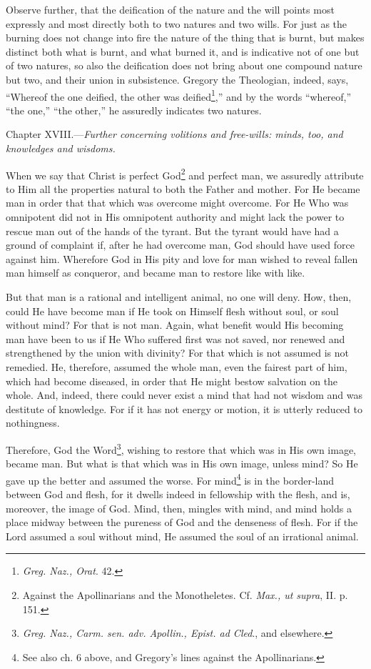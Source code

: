 Observe further, that the deification of the nature and the will points most expressly and most directly both to two natures and two wills. For just as the burning does not change into fire the nature of the thing that is burnt, but makes distinct both what is burnt, and what burned it, and is indicative not of one but of two natures, so also the deification does not bring about one compound nature but two, and their union in subsistence. Gregory the Theologian, indeed, says, “Whereof the one deified, the other was deified\footnote{\emph{Greg. Naz., Orat}. 42.},” and by the words “whereof,” “the one,” “the other,” he assuredly indicates two natures.


Chapter XVIII.—\emph{Further concerning volitions and free-wills: minds, too, and knowledges and wisdoms.}

When we say that Christ is perfect God\footnote{Against the Apollinarians and the Monotheletes. Cf. \emph{Max., ut supra}, II. p. 151.} and perfect man, we assuredly attribute to Him all the properties natural to both the Father and mother. For He became man in order that that which was overcome might overcome. For He Who was omnipotent did not in His omnipotent authority and might lack the power to rescue man out of the hands of the tyrant. But the tyrant would have had a ground of complaint if, after he had overcome man, God should have used force against him. Wherefore God in His pity and love for man wished to reveal fallen man himself as conqueror, and became man to restore like with like.

But that man is a rational and intelligent animal, no one will deny. How, then, could He have become man if He took on Himself flesh without soul, or soul without mind? For that is not man. Again, what benefit would His becoming man have been to us if He Who suffered first was not saved, nor renewed and strengthened by the union with divinity? For that which is not assumed is not remedied. He, therefore, assumed the whole man, even the fairest part of him, which had become diseased, in order that He might bestow salvation on the whole. And, indeed, there could never exist a mind that had not wisdom and was destitute of knowledge. For if it has not energy or motion, it is utterly reduced to nothingness.

Therefore, God the Word\footnote{\emph{Greg. Naz., Carm. sen. adv. Apollin., Epist. ad Cled}., and elsewhere.}, wishing to restore that which was in His own image, became man. But what is that which was in His own image, unless mind? So He gave up the better and assumed the worse. For mind\footnote{See also ch. 6 above, and Gregory’s lines against the Apollinarians.} is in the border-land between God and flesh, for it dwells indeed in fellowship with the flesh, and is, moreover, the image of God. Mind, then, mingles with mind, and mind holds a place midway between the pureness of God and the denseness of flesh. For if the Lord assumed a soul without mind, He assumed the soul of an irrational animal.

